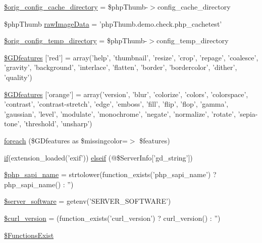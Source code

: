 \begin{DoxyCompactItemize}
\hyperlink{php_thumb_8demo_8check_8php_a7159b2a785ac35a7a04ffea57d616b0c}{\$orig\-\_\-config\-\_\-cache\-\_\-directory} = \$php\-Thumb-\/$>$config\-\_\-cache\-\_\-directory
\item 
\$php\-Thumb \hyperlink{php_thumb_8demo_8check_8php_a863670ff2c90a1dc616ebab121dbb296}{raw\-Image\-Data} = 'php\-Thumb.\-demo.\-check.\-php\-\_\-cachetest'
\item 
\hyperlink{php_thumb_8demo_8check_8php_a3d1766c9eb410f75e62121bf57cc7942}{\$orig\-\_\-config\-\_\-temp\-\_\-directory} = \$php\-Thumb-\/$>$config\-\_\-temp\-\_\-directory
\item 
\hyperlink{php_thumb_8demo_8check_8php_ab45b8bde8535f30f866c05e15aa29993}{\$\-G\-Dfeatures} \mbox{[}'red'\mbox{]} = array('help', 'thumbnail', 'resize', 'crop', 'repage', 'coalesce', 'gravity', 'background', 'interlace', 'flatten', 'border', 'bordercolor', 'dither', 'quality')
\item 
\hyperlink{php_thumb_8demo_8check_8php_aa39d69ebc927d9cbbd26707a8142fd74}{\$\-G\-Dfeatures} \mbox{[}'orange'\mbox{]} = array('version', 'blur', 'colorize', 'colors', 'colorspace', 'contrast', 'contrast-\/stretch', 'edge', 'emboss', 'fill', 'flip', 'flop', 'gamma', 'gaussian', 'level', 'modulate', 'monochrome', 'negate', 'normalize', 'rotate', 'sepia-\/tone', 'threshold', 'unsharp')
\item 
\hyperlink{php_thumb_8demo_8check_8php_a6415d22e6459a27b21ea80a866c72ec1}{foreach} (\$\-G\-Dfeatures as \$missingcolor=$>$ \$features)
\item 
\hyperlink{_setup_8inc_8php_ad0184337b31d13763ec8751feff4aabe}{if}(extension\-\_\-loaded('exif')) \hyperlink{php_thumb_8demo_8check_8php_af92779326267616cd7c3cdaaa9484bc9}{elseif} (@\$\-Server\-Info\mbox{[}'gd\-\_\-string'\mbox{]})
\item 
\hyperlink{php_thumb_8demo_8check_8php_ad475c14b05e96964a42b4c3859f4aff4}{\$php\-\_\-sapi\-\_\-name} = strtolower(function\-\_\-exists('php\-\_\-sapi\-\_\-name') ? php\-\_\-sapi\-\_\-name() \-: '')
\item 
\hyperlink{php_thumb_8demo_8check_8php_a21f2f1ca62b06bd0a188ee2e239db5ff}{\$server\-\_\-software} = getenv('\-S\-E\-R\-V\-E\-R\-\_\-\-S\-O\-F\-T\-W\-A\-R\-E')
\item 
\hyperlink{php_thumb_8demo_8check_8php_aaf650bea5bf4627e22c03e71b845b87c}{\$curl\-\_\-version} = (function\-\_\-exists('curl\-\_\-version') ? curl\-\_\-version() \-: '')
\item 
\hyperlink{php_thumb_8demo_8check_8php_ab54d96bbc12fd7896af863677487eb01}{\$\-Functions\-Exist}

\end{DoxyCompactItemize}
